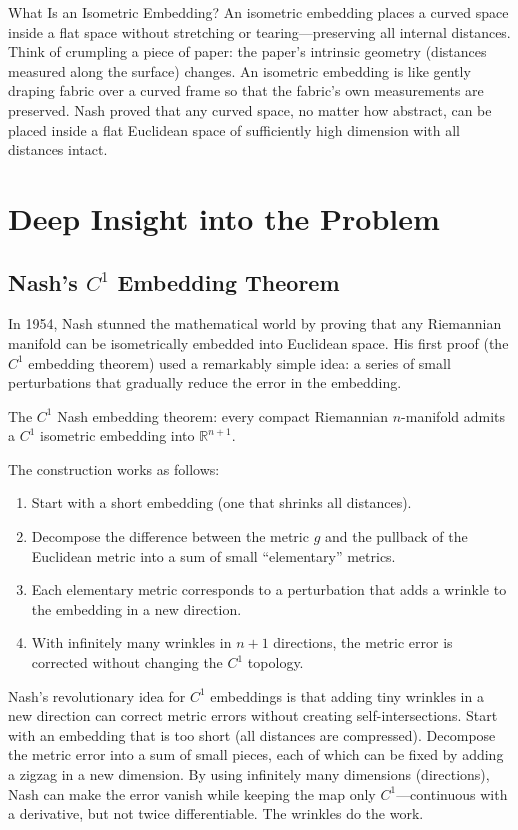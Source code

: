 \begin{knowledgebridge}{What Is an Isometric Embedding?}
An isometric embedding places a curved space inside a flat space without stretching or tearing---preserving all internal distances. Think of crumpling a piece of paper: the paper's intrinsic geometry (distances measured along the surface) changes. An isometric embedding is like gently draping fabric over a curved frame so that the fabric's own measurements are preserved. Nash proved that any curved space, no matter how abstract, can be placed inside a flat Euclidean space of sufficiently high dimension with all distances intact.
\end{knowledgebridge}

\section{Deep Insight into the Problem}

\subsection{Nash's \texorpdfstring{$C^1$}{C\^{}1} Embedding Theorem}

In 1954, Nash stunned the mathematical world by proving that any Riemannian manifold can be isometrically embedded into Euclidean space. His first proof (the $C^1$ embedding theorem) used a remarkably simple idea: a series of small perturbations that gradually reduce the error in the embedding.

The $C^1$ Nash embedding theorem: every compact Riemannian $n$-manifold admits a $C^1$ isometric embedding into $\mathbb{R}^{n+1}$.

The construction works as follows:
\begin{enumerate}
\item Start with a short embedding (one that shrinks all distances).
\item Decompose the difference between the metric $g$ and the pullback of the Euclidean metric into a sum of small ``elementary'' metrics.
\item Each elementary metric corresponds to a perturbation that adds a wrinkle to the embedding in a new direction.
\item With infinitely many wrinkles in $n+1$ directions, the metric error is corrected without changing the $C^1$ topology.
\end{enumerate}

\begin{bigidea}
Nash's revolutionary idea for $C^1$ embeddings is that adding tiny wrinkles in a new direction can correct metric errors without creating self-intersections. Start with an embedding that is too short (all distances are compressed). Decompose the metric error into a sum of small pieces, each of which can be fixed by adding a zigzag in a new dimension. By using infinitely many dimensions (directions), Nash can make the error vanish while keeping the map only $C^1$---continuous with a derivative, but not twice differentiable. The wrinkles do the work.
\end{bigidea}

